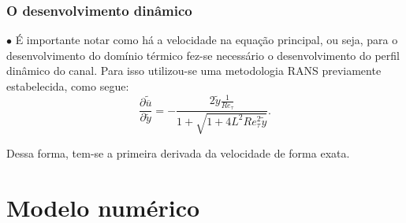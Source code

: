 \documentclass[xcolor=dvipsnames,10pt,aspectratio=169]{beamer}
\begin{document}
	
	
		\begin{frame}
			\frametitle{O desenvolvimento dinâmico}
			$\bullet$ É importante notar como há a velocidade na equação principal, ou seja, para o desenvolvimento do domínio térmico fez-se necessário o desenvolvimento do perfil dinâmico do canal. Para isso utilizou-se uma metodologia RANS previamente estabelecida, como segue: 
				\begin{equation}
				\frac{\partial \tilde{\overline{u}}}{\partial \tilde{y}} = - \frac{2 \tilde{y} \frac{1}{Re_\tau} }{ 1 + \sqrt{ 1 + 4 L ^2 Re_\tau ^2 \tilde{y}}}.
				\end{equation}	
				
			Dessa forma, tem-se a primeira derivada da velocidade de forma exata.
		\end{frame}
	
	

	
	
	\section{Modelo numérico}
		
	
	
	
		
\end{document}
